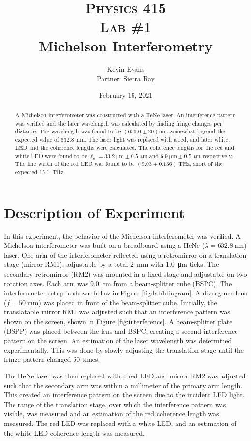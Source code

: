 \documentclass[notitlepage]{report}
\title{
	\textsc{ \small
		Physics 415
	} \\
	{\textsc{\small Lab \#1}} \\
	Michelson Interferometry
}
\author{Kevin Evans \\ Partner: Sierra Ray}
\date{February 16, 2021}
\begin{document}
	\begin{titlingpage}
		\maketitle
		\begin{abstract}
			\noindent A Michelson interferometer was constructed with a HeNe laser. An interference pattern was verified and the laser wavelength was calculated by finding fringe changes per distance. The wavelength was found to be $\left(\num{656.0} \pm \num{20}\right) \si{\nm}$, somewhat beyond the expected value of \SI{632.8}{\nm}. The laser light was replaced with a red, and later white, LED and the coherence lengths were calculated. The coherence lengths for the red and white LED were found to be $\ell_c = \SI{33.2}{\um} \pm \SI{0.5}{\um}$ and $\SI{6.9}{\um} \pm \SI{0.5}{\um}$ respectively. The line width of the red LED was found to be $(9.03 \pm 0.136) \; \si{\THz}$, short of the expected \SI{15.1}{\THz}.
		\end{abstract}
	\end{titlingpage}

	\section{Description of Experiment}
	In this experiment, the behavior of the Michelson interferometer was verified. A Michelson interferometer was built on a broadboard using a HeNe ($\lambda = \SI{632.8}{\nm}$) laser. One arm of the interferometer reflected using a retromirror on a translation stage (mirror RM1), adjustable by a total \SI{2}{\mm} with \SI{1.0}{\um} ticks. %
	The secondary retromirror (RM2) was mounted in a fixed stage and adjustable on two rotation axes. Each arm was \SI{9.0}{\centi\meter} from a beam-splitter cube (BSPC). The interferometer setup is shown below in Figure \ref{fig:lab1diagram}. A divergence lens ($f=\SI{50}{\mm}$) was placed in front of the beam-splitter cube. Initially, the translatable mirror RM1 was adjusted such that an interference pattern was shown on the screen, shown in Figure \ref{fig:interference}. A beam-splitter plate (BSPP) was placed between the lens and BSPC, creating a second interference pattern on the screen. An estimation of the laser wavelength was determined experimentally. This was done by slowly adjusting the translation stage until the fringe pattern changed 50 times.
	
	The HeNe laser was then replaced with a red LED and mirror RM2 was adjusted such that the secondary arm was within a millimeter of the primary arm length. This created an interference pattern on the screen due to the incident LED light. The range of the translation stage, over which the interference pattern was visible, was measured and an estimation of the red coherence length was measured. The red LED was replaced with a white LED, and an estimation of the white LED coherence length was measured.
	
\end{document}
